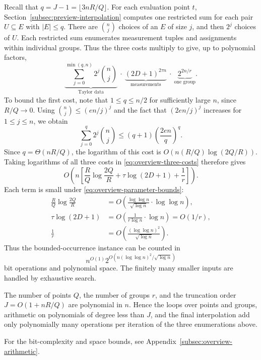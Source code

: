\documentclass[11pt,reqno]{amsart}
\numberwithin{equation}{section}
\theoremstyle{definition}\newtheorem{definition}[theorem]{Definition}
\theoremstyle{remark}\newtheorem{remark}[theorem]{Remark}
\renewcommand{\le}{\leqslant}
\begin{document}
Recall that $q=J-1=\lfloor3nR/Q\rfloor$. For each evaluation
point $t$, Section~\ref{subsec:preview-interpolation} computes one
restricted sum for each pair $U\subseteq E$ with $|E|\le q$.
There are $\binom nj$ choices of an $E$ of size $j$, and then
$2^j$ choices of $U$. Each restricted sum enumerates measurement
tuples and assignments within individual groups. Thus the three
costs multiply to give, up to polynomial factors,
\begin{equation}\label{eq:overview-three-costs}
 \underbrace{\sum_{j=0}^{\min(q,n)}2^j\binom nj}_{\text{Taylor data}}
 \ \cdot\
 \underbrace{(2D+1)^{2\tau n}}_{\text{measurements}}
 \ \cdot\
 \underbrace{2^{2n/r}}_{\text{one group}}.
\end{equation}
To bound the first cost, note that $1\le q\le n/2$ for
sufficiently large $n$, since $R/Q\to0$. Using
$\binom nj\le(en/j)^j$ and the fact that $(2en/j)^j$ increases
for $1\le j\le n$, we obtain
\[
 \sum_{j=0}^q2^j\binom nj
 \le(q+1)\left(\frac{2en}{q}\right)^q.
\]
Since $q=\Theta(nR/Q)$, the logarithm of this cost is
$O(n(R/Q)\log(2Q/R))$. Taking logarithms of all three costs in
\eqref{eq:overview-three-costs} therefore gives
\[
 O\!\left(n\left[
       \frac RQ\log\frac{2Q}{R}
       +\tau\log(2D+1)+\frac1r\right]\right).
\]
Each term is small under \eqref{eq:overview-parameter-bounds}:
\[
 \begin{aligned}
 \frac RQ\log\frac{2Q}{R}
   &=O\!\left(\frac{\log\log n}{\sqrt{\log n}}
                      \cdot\log\log n\right),\\
 \tau\log(2D+1)&=O\!\left(\frac1{r\log n}\cdot\log n\right)
                  =O(1/r),\\
 \frac1r&=O\!\left(\frac{(\log\log n)^2}{\sqrt{\log n}}\right).
 \end{aligned}
\]
Thus the bounded-occurrence instance can be counted in
\begin{equation}\label{eq:overview-bounded-time}
 n^{O(1)}2^{O(n(\log\log n)^2/\sqrt{\log n})}
\end{equation}
bit operations and polynomial space. The finitely many smaller
inputs are handled by exhaustive search.

The number of points $Q$, the number of groups $r$, and the
truncation order $J=O(1+nR/Q)$ are polynomial in $n$. Hence the
loops over points and groups, arithmetic on polynomials of degree
less than $J$, and the final interpolation add only polynomially
many operations per iteration of the three enumerations above.

For the bit-complexity and space bounds, see
Appendix~\ref{subsec:overview-arithmetic}.
\end{document}
